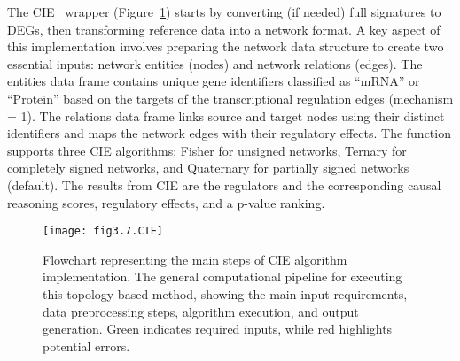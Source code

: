 The \gls{CIE}~\cite{RN81} wrapper (Figure~\ref{fig:fig3.7.CIE}) starts by converting (if needed) full signatures to DEGs, then transforming reference data into a network format. A key aspect of this implementation involves preparing the network data structure to create two essential inputs: network entities (nodes) and network relations (edges). The entities data frame contains unique gene identifiers classified as “mRNA” or “Protein” based on the targets of the transcriptional regulation edges (mechanism = 1). The relations data frame links source and target nodes using their distinct identifiers and maps the network edges with their regulatory effects. The function supports three CIE algorithms: Fisher for unsigned networks, Ternary for completely signed networks, and Quaternary for partially signed networks (default). The results from CIE are the regulators and the corresponding causal reasoning scores, regulatory effects, and a p-value ranking.


\begin{figure}[htbp]
    \centering
    \texttt{[image: fig3.7.CIE]}
    \caption[Flowchart representing the main steps of CIE algorithm implementation.]{Flowchart representing the main steps of CIE algorithm implementation. The general computational pipeline for executing this topology-based method, showing the main input requirements, data preprocessing steps, algorithm execution, and output generation. Green indicates required inputs, while red highlights potential errors.}
    \label{fig:fig3.7.CIE}
\end{figure}

